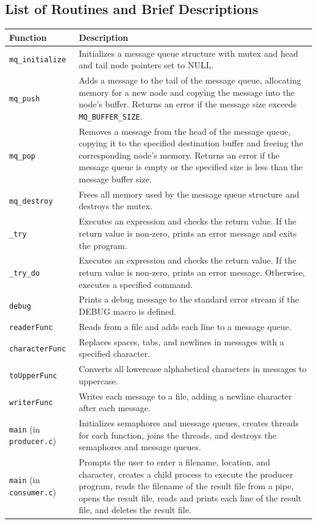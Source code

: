 \documentclass{article}
\begin{document}
\subsection{List of Routines and Brief Descriptions}
\begin{center}
\begin{tabular}{|p{4cm}|p{7cm}|}
\hline
\textbf{Function} & \textbf{Description} \\ \hline
\texttt{mq\_initialize} & Initializes a message queue structure with mutex and head and tail node pointers set to NULL.\\ \hline
\texttt{mq\_push} & Adds a message to the tail of the message queue, allocating memory for a new node and copying the message into the node's buffer. Returns an error if the message size exceeds \texttt{MQ\_BUFFER\_SIZE}. \\ \hline
\texttt{mq\_pop} & Removes a message from the head of the message queue, copying it to the specified destination buffer and freeing the corresponding node's memory. Returns an error if the message queue is empty or the specified size is less than the message buffer size. \\ \hline
\texttt{mq\_destroy} & Frees all memory used by the message queue structure and destroys the mutex. \\ \hline
\texttt{\_try} & Executes an expression and checks the return value. If the return value is non-zero, prints an error message and exits the program. \\ \hline
\texttt{\_try\_do} & Executes an expression and checks the return value. If the return value is non-zero, prints an error message. Otherwise, executes a specified command. \\ \hline
\texttt{debug} & Prints a debug message to the standard error stream if the DEBUG macro is defined. \\ \hline
\texttt{readerFunc} & Reads from a file and adds each line to a message queue. \\ \hline
\texttt{characterFunc} & Replaces spaces, tabs, and newlines in messages with a specified character. \\ \hline
\texttt{toUpperFunc} & Converts all lowercase alphabetical characters in messages to uppercase. \\ \hline
\texttt{writerFunc} & Writes each message to a file, adding a newline character after each message. \\ \hline
\texttt{main} (in \texttt{producer.c}) & Initializes semaphores and message queues, creates threads for each function, joins the threads, and destroys the semaphores and message queues. \\ \hline
\texttt{main} (in \texttt{consumer.c}) & Prompts the user to enter a filename, location, and character, creates a child process to execute the producer program, reads the filename of the result file from a pipe, opens the result file, reads and prints each line of the result file, and deletes the result file. \\ \hline
\end{tabular}
\end{center}
\newpage
\end{document}
